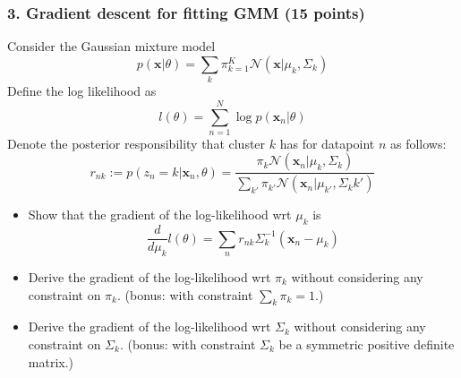 \documentclass[12pt]{article}%
\begin{document}
\subsubsection*{3. Gradient descent for fitting GMM (15 points)}
Consider the Gaussian mixture model
\[p(\mathbf{x}|\theta)=\sum_k \pi_{k=1}^K \mathcal{N}(\mathbf{x}|\mu_k,\Sigma_k)\]
Define the log likelihood as
\[ l(\theta) = \sum_{n=1}^N \log p(\mathbf{x}_n|\theta)
\]
Denote the posterior responsibility that cluster $k$ has for datapoint $n$ as follows:
\[
r_{nk}:=p(z_n=k|\mathbf{x}_n,\theta) = \frac{\pi_k\mathcal{N}(\mathbf{x}_n|\mu_k,\Sigma_k)}{\sum_{k'}\pi_{k'}\mathcal{N}(\mathbf{x}_n|\mu_{k'},\Sigma_k{k'})}
\]

\begin{itemize}
	
	\item Show that the gradient of the log-likelihood wrt $\mu_k$ is
	\[ \frac{d}{d\mu_k}l(\theta) = \sum_n r_{nk}\Sigma_k^{-1}(\mathbf{x}_n-\mu_k)
	\]
    \item Derive the gradient of the log-likelihood wrt $\pi_k$ without considering any constraint on $\pi_k$. (bonus: with constraint $\sum_k\pi_k=1$.)
    \item Derive the gradient of the log-likelihood wrt $\Sigma_k$ without considering any constraint on $\Sigma_k$. (bonus: with constraint $\Sigma_k$ be a symmetric positive definite matrix.) 
	
\end{itemize}


\newpage

\nocite{*} 


\end{document}
